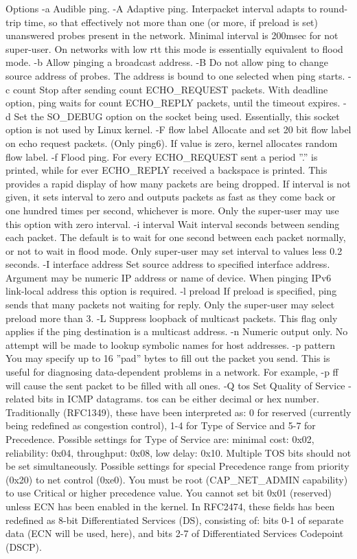 Options
-a Audible ping.
-A Adaptive ping. Interpacket interval adapts to round-trip time, so that effectively not more than one (or more, if preload is set) unanswered probes present in the network. Minimal interval is 200msec for not super-user. On networks with low rtt this mode is essentially equivalent to flood mode.
-b Allow pinging a broadcast address.
-B Do not allow ping to change source address of probes. The address is bound to one selected when ping starts.
-c count Stop after sending count ECHO_REQUEST packets. With deadline option, ping waits for count ECHO_REPLY packets, until the timeout expires.
-d Set the SO_DEBUG option on the socket being used. Essentially, this socket option is not used by Linux kernel.
-F flow label Allocate and set 20 bit flow label on echo request packets. (Only ping6). If value is zero, kernel allocates random flow label.
-f Flood ping. For every ECHO_REQUEST sent a period ''.'' is printed, while for ever ECHO_REPLY received a backspace is printed. This provides a rapid display of how many packets are being dropped. If interval is not given, it sets interval to zero and outputs packets as fast as they come back or one hundred times per second, whichever is more. Only the super-user may use this option with zero interval.
-i interval Wait interval seconds between sending each packet. The default is to wait for one second between each packet normally, or not to wait in flood mode. Only super-user may set interval to values less 0.2 seconds.
-I interface address Set source address to specified interface address. Argument may be numeric IP address or name of device. When pinging IPv6 link-local address this option is required.
-l preload If preload is specified, ping sends that many packets not waiting for reply. Only the super-user may select preload more than 3.
-L Suppress loopback of multicast packets. This flag only applies if the ping destination is a multicast address.
-n Numeric output only. No attempt will be made to lookup symbolic names for host addresses.
-p pattern You may specify up to 16 ''pad'' bytes to fill out the packet you send. This is useful for diagnosing data-dependent problems in a network. For example, -p ff will cause the sent packet to be filled with all ones.
-Q tos Set Quality of Service -related bits in ICMP datagrams. tos can be either decimal or hex number. Traditionally (RFC1349), these have been interpreted as: 0 for reserved (currently being redefined as congestion control), 1-4 for Type of Service and 5-7 for Precedence. Possible settings for Type of Service are: minimal cost: 0x02, reliability: 0x04, throughput: 0x08, low delay: 0x10. Multiple TOS bits should not be set simultaneously. Possible settings for special Precedence range from priority (0x20) to net control (0xe0). You must be root (CAP_NET_ADMIN capability) to use Critical or higher precedence value. You cannot set bit 0x01 (reserved) unless ECN has been enabled in the kernel. In RFC2474, these fields has been redefined as 8-bit Differentiated Services (DS), consisting of: bits 0-1 of separate data (ECN will be used, here), and bits 2-7 of Differentiated Services Codepoint (DSCP).
